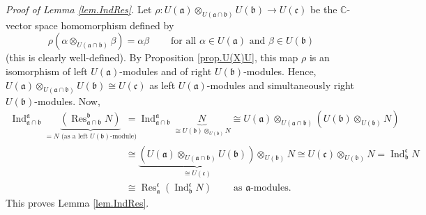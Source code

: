 \documentclass
[numbers=enddot,12pt,final,onecolumn,german,notitlepage]{scrartcl}%
\theoremstyle{definition}
\begin{document}
\textit{Proof of Lemma \ref{lem.IndRes}.} Let $\rho:U\left(  \mathfrak{a}%
\right)  \otimes_{U\left(  \mathfrak{a}\cap\mathfrak{b}\right)  }U\left(
\mathfrak{b}\right)  \rightarrow U\left(  \mathfrak{c}\right)  $ be the
$\mathbb{C}$-vector space homomorphism defined by%
\[
\rho\left(  \alpha\otimes_{U\left(  \mathfrak{a}\cap\mathfrak{b}\right)
}\beta\right)  =\alpha\beta\ \ \ \ \ \ \ \ \ \ \text{for all }\alpha\in
U\left(  \mathfrak{a}\right)  \text{ and }\beta\in U\left(  \mathfrak{b}%
\right)
\]
(this is clearly well-defined). By Proposition \ref{prop.U(X)U}, this map
$\rho$ is an isomorphism of left $U\left(  \mathfrak{a}\right)  $-modules and
of right $U\left(  \mathfrak{b}\right)  $-modules. Hence, $U\left(
\mathfrak{a}\right)  \otimes_{U\left(  \mathfrak{a}\cap\mathfrak{b}\right)
}U\left(  \mathfrak{b}\right)  \cong U\left(  \mathfrak{c}\right)  $ as left
$U\left(  \mathfrak{a}\right)  $-modules and simultaneously right $U\left(
\mathfrak{b}\right)  $-modules. Now,%
\begin{align*}
\operatorname*{Ind}\nolimits_{\mathfrak{a}\cap\mathfrak{b}}^{\mathfrak{a}%
}\underbrace{\left(  \operatorname*{Res}\nolimits_{\mathfrak{a}\cap
\mathfrak{b}}^{\mathfrak{b}}N\right)  }_{=N\text{ (as a left }U\left(
\mathfrak{b}\right)  \text{-module)}}  &  =\operatorname*{Ind}%
\nolimits_{\mathfrak{a}\cap\mathfrak{b}}^{\mathfrak{a}}\underbrace{N}_{\cong
U\left(  \mathfrak{b}\right)  \otimes_{U\left(  \mathfrak{b}\right)  }N}\cong
U\left(  \mathfrak{a}\right)  \otimes_{U\left(  \mathfrak{a}\cap
\mathfrak{b}\right)  }\left(  U\left(  \mathfrak{b}\right)  \otimes_{U\left(
\mathfrak{b}\right)  }N\right) \\
&  \cong\underbrace{\left(  U\left(  \mathfrak{a}\right)  \otimes_{U\left(
\mathfrak{a}\cap\mathfrak{b}\right)  }U\left(  \mathfrak{b}\right)  \right)
}_{\cong U\left(  \mathfrak{c}\right)  }\otimes_{U\left(  \mathfrak{b}\right)
}N\cong U\left(  \mathfrak{c}\right)  \otimes_{U\left(  \mathfrak{b}\right)
}N=\operatorname*{Ind}\nolimits_{\mathfrak{b}}^{\mathfrak{c}}N\\
&  \cong\operatorname*{Res}\nolimits_{\mathfrak{a}}^{\mathfrak{c}}\left(
\operatorname*{Ind}\nolimits_{\mathfrak{b}}^{\mathfrak{c}}N\right)
\ \ \ \ \ \ \ \ \ \ \text{as }\mathfrak{a}\text{-modules.}%
\end{align*}
This proves Lemma \ref{lem.IndRes}.
\end{document}
